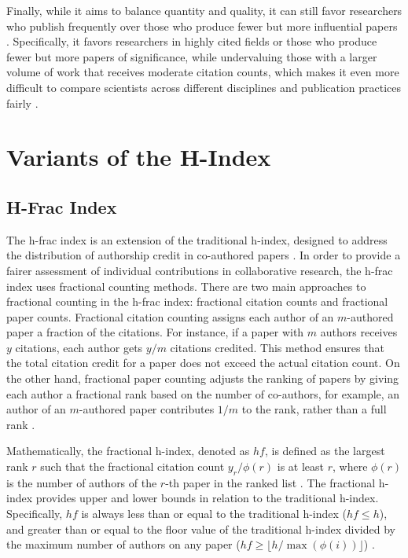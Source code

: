 Finally, while it aims to balance quantity and quality, it can still favor
researchers who publish frequently over those who produce fewer but more
influential papers
\cite{hirsch2005index,costas2007h,waltman2012inconsistency,norris2010h,egghe2010hirsch,hirsch2014meaning}.
Specifically, it favors researchers in highly cited fields or those who produce
fewer but more papers of significance, while undervaluing those with a larger
volume of work that receives moderate citation counts, which makes it even more
difficult to compare scientists across different disciplines and publication
practices fairly
\cite{hirsch2005index,costas2007h,waltman2012inconsistency,egghe2010hirsch}.

\section{Variants of the H-Index}
\subsection{H-Frac Index}
The h-frac index is an extension of the traditional h-index, designed to
address the distribution of authorship credit in co-authored papers
\cite{egghe2008mathematical}. In order to provide a fairer assessment of
individual contributions in collaborative research, the h-frac index uses
fractional counting methods. There are two main approaches to fractional
counting in the h-frac index: fractional citation counts and fractional paper
counts. Fractional citation counting assigns each author of an $m$-authored
paper a fraction of the citations. For instance, if a paper with $m$ authors
receives $y$ citations, each author gets $y/m$ citations credited. This method
ensures that the total citation credit for a paper does not exceed the actual
citation count. On the other hand, fractional paper counting adjusts the
ranking of papers by giving each author a fractional rank based on the number
of co-authors, for example, an author of an $m$-authored paper contributes
$1/m$ to the rank, rather than a full rank
\cite{egghe2008mathematical,bihari2018h}.

Mathematically, the fractional h-index, denoted as $hf$, is defined as the
largest rank $r$ such that the fractional citation count $y_r/\phi(r)$ is at
least $r$, where $\phi(r)$ is the number of authors of the $r$-th paper in the
ranked list \cite{egghe2008mathematical}. The fractional h-index provides upper
and lower bounds in relation to the traditional h-index. Specifically, $hf$ is
always less than or equal to the traditional h-index ($hf \leq h$), and greater
than or equal to the floor value of the traditional h-index divided by the
maximum number of authors on any paper ($hf \geq \lfloor h / \max(\phi(i))
    \rfloor$) \cite{egghe2008mathematical}.


